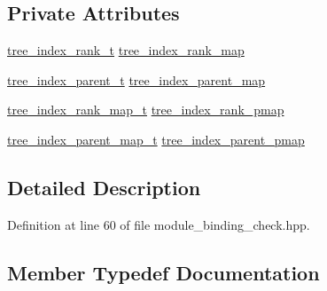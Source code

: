 \subsection*{Private Attributes}
\begin{DoxyCompactItemize}
\item 
\hyperlink{classmodule__register__binding__spec_a151eec9e0ca85fdf97be1090bf8d46ad}{tree\+\_\+index\+\_\+rank\+\_\+t} \hyperlink{classmodule__register__binding__spec_a2ba94e276e0490f7e63e0b723a603438}{tree\+\_\+index\+\_\+rank\+\_\+map}
\item 
\hyperlink{classmodule__register__binding__spec_a7caa9258582c53bbbb84194770abe960}{tree\+\_\+index\+\_\+parent\+\_\+t} \hyperlink{classmodule__register__binding__spec_a66eabfd29036a19cc56ee749e6548bbf}{tree\+\_\+index\+\_\+parent\+\_\+map}
\item 
\hyperlink{classmodule__register__binding__spec_a8336f338b308445a062ca2f293617f67}{tree\+\_\+index\+\_\+rank\+\_\+map\+\_\+t} \hyperlink{classmodule__register__binding__spec_aef706cf750b380dd274d647ecd4ee5a1}{tree\+\_\+index\+\_\+rank\+\_\+pmap}
\item 
\hyperlink{classmodule__register__binding__spec_a5d303749648df3668e9ccf7c368660cb}{tree\+\_\+index\+\_\+parent\+\_\+map\+\_\+t} \hyperlink{classmodule__register__binding__spec_aded5834534db10be2a604bc405399bc0}{tree\+\_\+index\+\_\+parent\+\_\+pmap}
\end{DoxyCompactItemize}


\subsection{Detailed Description}


Definition at line 60 of file module\+\_\+binding\+\_\+check.\+hpp.



\subsection{Member Typedef Documentation}
\mbox{\label{classmodule__register__binding__spec_a26171ae8c88c4fe1a5397cdd47d417e3}} 
